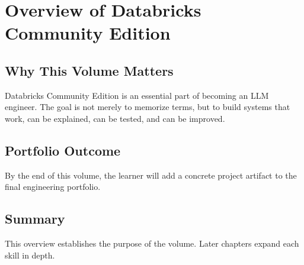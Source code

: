 
\chapter{Overview of Databricks Community Edition}
\label{chap:volume11-overview}



\section{Why This Volume Matters}

Databricks Community Edition is an essential part of becoming an LLM engineer. The goal is not merely to memorize terms, but to build systems that work, can be explained, can be tested, and can be improved.

\section{Portfolio Outcome}

By the end of this volume, the learner will add a concrete project artifact to the final engineering portfolio.

\section{Summary}

This overview establishes the purpose of the volume. Later chapters expand each skill in depth.
